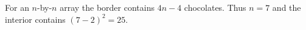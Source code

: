 For an $n$-by-$n$ array the border contains $4n-4$ chocolates. Thus $n=7$ and the interior contains $(7-2)^2=\boxed{25}$.
